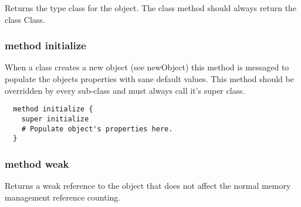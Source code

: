 Returns the type class for the object. The class method should always return
the class Class.

\hfill
\subsubsection {method initialize}
When a class creates a new object (see newObject) this method is messaged
to populate the objects properties with sane default values. This method
should be overridden by every sub-class and must always call it's super
class.

\begin{lstlisting}
  method initialize {
    super initialize
    # Populate object's properties here.
  }
\end{lstlisting}

\subsubsection {method weak}

Returns a weak reference to the object that does not affect the normal
memory management reference counting.
